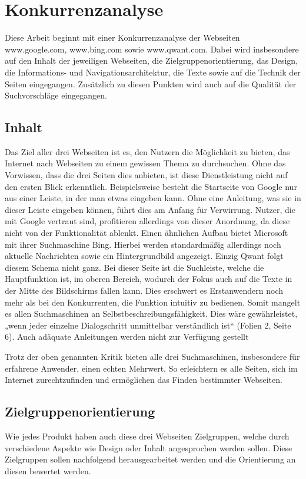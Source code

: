 \documentclass[11pt]{article}
\begin{document}
\section{Konkurrenzanalyse}
Diese Arbeit beginnt mit einer Konkurrenzanalyse der Webseiten www.google.com, www.bing.com sowie www.qwant.com.
Dabei wird insbesondere auf den Inhalt der jeweiligen Webseiten, die Zielgruppenorientierung, das Design, die Informations-
und Navigationsarchitektur, die Texte sowie auf die Technik der Seiten eingegangen. Zusätzlich zu diesen Punkten wird auch
auf die Qualität der Suchvorschläge eingegangen.

\subsection{Inhalt}
Das Ziel aller drei Webseiten ist es, den Nutzern die Möglichkeit zu bieten, das Internet nach Webseiten zu einem gewissen
Thema zu durchsuchen. Ohne das Vorwissen, dass die drei Seiten dies anbieten, ist diese Dienstleistung nicht auf den ersten
Blick erkenntlich. Beispielsweise besteht die Startseite von Google nur aus einer Leiste, in der man etwas eingeben kann.
Ohne eine Anleitung, was sie in dieser Leiste eingeben können, führt dies am Anfang für Verwirrung. Nutzer, die mit Google
vertraut sind, profitieren allerdings von dieser Anordnung, da diese nicht von der Funktionalität ablenkt. Einen ähnlichen
Aufbau bietet Microsoft mit ihrer Suchmaschine Bing. Hierbei werden standardmäßig allerdings noch aktuelle Nachrichten sowie
ein Hintergrundbild angezeigt. Einzig Qwant folgt diesem Schema nicht ganz. Bei dieser Seite ist die Suchleiste, welche die
Hauptfunktion ist, im oberen Bereich, wodurch der Fokus auch auf die Texte in der Mitte des Bildschirms fallen kann. Dies
erschwert es Erstanwendern noch mehr als bei den Konkurrenten, die Funktion intuitiv zu bedienen. Somit mangelt es allen
Suchmaschinen an Selbstbeschreibungsfähigkeit. Dies wäre gewährleistet, „wenn jeder einzelne Dialogschritt unmittelbar
verständlich ist“ (Folien 2, Seite 6). Auch adäquate Anleitungen werden nicht zur Verfügung gestellt

Trotz der oben genannten Kritik bieten alle drei Suchmaschinen, insbesondere für erfahrene Anwender, einen echten Mehrwert.
So erleichtern es alle Seiten, sich im Internet zurechtzufinden und ermöglichen das Finden bestimmter Webseiten.

\subsection{Zielgruppenorientierung}
Wie jedes Produkt haben auch diese drei Webseiten Zielgruppen, welche durch verschiedene Aspekte wie Design oder Inhalt
angesprochen werden sollen. Diese Zielgruppen sollen nachfolgend herausgearbeitet werden und die Orientierung an diesen
bewertet werden.
\end{document}
